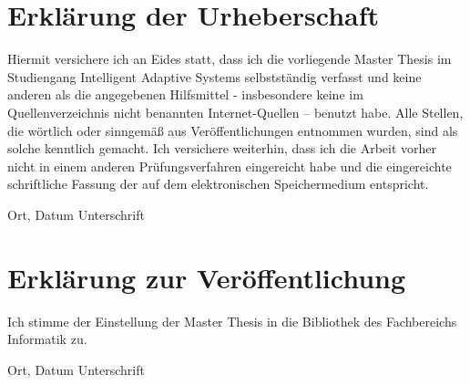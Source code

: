 \documentclass[12pt,final,twoside]{report}
\newcommand{\trtype}{Master Thesis} %
\newcommand{\trcourseofstudies}{Intelligent Adaptive Systems} %
\theoremstyle{plain}
\theoremstyle{definition}
\theoremstyle{remark}
\begin{document}
\vspace{2cm}
\chapter*{Erkl\"arung der Urheberschaft}
\label{sec:urheber}
	Hiermit versichere ich an Eides statt, dass ich die vorliegende
	\trtype{} im Studiengang \trcourseofstudies{}
	selbstst{\"a}ndig verfasst und keine anderen als die angegebenen
	Hilfsmittel - insbesondere keine im Quellenverzeichnis nicht
	benannten Internet-Quellen – benutzt habe. Alle Stellen, die
	w{\"o}rtlich oder sinngem{\"a}{\ss} aus Ver{\"o}ffentlichungen entnommen wurden,
	sind als solche kenntlich gemacht. Ich versichere weiterhin, dass
	ich die Arbeit vorher nicht in einem anderen Pr{\"u}fungsverfahren
	eingereicht habe und die eingereichte schriftliche Fassung der
	auf dem elektronischen Speichermedium entspricht.
	
\vspace{4cm}
\noindent Ort, Datum \hfill Unterschrift

\newpage
\thispagestyle{empty}
\hspace{1cm}
\newpage

\vspace{2cm}
\chapter*{Erkl\"arung zur Ver\"offentlichung}
\label{sec:urheber}
Ich stimme der Einstellung der \trtype{} in die Bibliothek des Fachbereichs Informatik zu.

\vspace{4cm}
\noindent Ort, Datum \hfill Unterschrift

\newpage
\thispagestyle{empty}
\hspace{1cm}
\newpage
\end{document}
